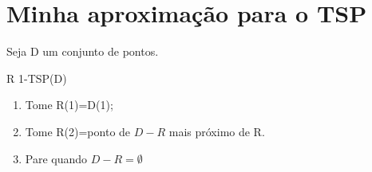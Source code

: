 \section{Minha aproximação para o TSP}

 Seja D um conjunto de pontos.

R 1-TSP(D)
\begin{enumerate}
\item Tome R(1)=D(1);
\item Tome R(2)=ponto de $D-R$ mais próximo de R.
\item Pare quando $D-R=\emptyset$
\end{enumerate}
